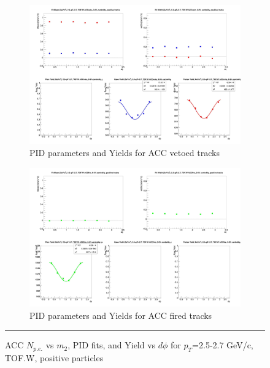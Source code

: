 \begin{figure}[H]
  \ContinuedFloat
    \begin{subfigure}{1\textwidth}
    \includegraphics[width=1\textwidth]{hiptfits/pos/fitParams_tof2_cent0_ch1_pT-25-27.jpg}
    \caption{PID parameters and Yields for ACC vetoed tracks}
    \end{subfigure}    
    \begin{subfigure}{1\textwidth}
    \includegraphics[width=1\textwidth]{hiptfits/pos/fitParams_tof3_cent0_ch1_pT-25-27.jpg}
    \caption{PID parameters and Yields for ACC fired tracks}
    \end{subfigure} 
    \rule{35em}{0.5pt}
  \caption[ACC $N_{p.e.}$ vs $m_2$, PID fits, and Yield vs $d\phi$ for $p_T$=2.5-2.7 GeV/c, TOF.W, negative particles]{ACC $N_{p.e.}$ vs $m_2$, PID fits, and Yield vs $d\phi$ for $p_T$=2.5-2.7 GeV/c, TOF.W, positive particles}
  \label{fig:acc25-27pos}
\end{figure}

